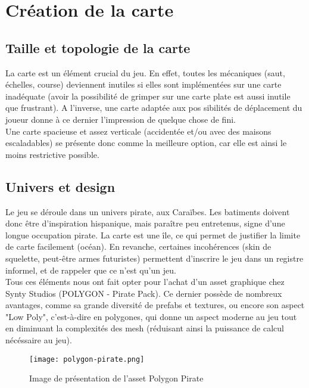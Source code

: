 \documentclass[../doc.tex]{subfiles}
\begin{document}
    \section{Création de la carte}

    \subsection{Taille et topologie de la carte}
    
    La carte est un élément crucial du jeu. En effet, toutes les mécaniques 
    (saut, échelles, course)
    deviennent inutiles si elles sont implémentées sur une carte inadéquate (avoir la 
    possibilité de grimper sur une carte plate est aussi inutile que frustrant).
    A l'inverse, une carte adaptée aux pos
    sibilités de déplacement du joueur donne à ce dernier
    l'impression de quelque chose de fini.
    \\

    Une carte spacieuse et assez verticale (accidentée et/ou avec des maisons escaladables)
    se présente donc comme la meilleure option, car elle est ainsi le moins restrictive possible.

    \subsection{Univers et design}

    Le jeu se déroule dans un univers pirate, aux Caraïbes.
    Les batiments doivent donc être d'inspiration hispanique,
    mais paraître peu entretenus, signe d'une longue occupation 
    pirate. La carte est une île, ce qui permet de justifier
    la limite de carte facilement (océan). En revanche, certaines 
    incohérences (skin de squelette, peut-être armes futuristes)
    permettent d'inscrire le jeu dans un registre informel, et de 
    rappeler que ce n'est qu'un jeu.
    \\

    Tous ces éléments nous ont fait opter pour l'achat d'un asset graphique chez 
    Synty Studios (POLYGON - Pirate Pack).
    Ce dernier possède de nombreux avantages, comme sa grande diversité de prefabs et 
    textures, ou encore son aspect "Low Poly", 
    c'est-à-dire en polygones, qui donne un aspect moderne au jeu tout en diminuant la 
    complexités des mesh (réduisant ainsi la 
    puissance de calcul nécéssaire au jeu).
    \\ 

    \begin{figure}[!ht]
        \centering
        \texttt{[image: polygon-pirate.png]}
        \caption{Image de présentation de l'asset Polygon Pirate}
    \end{figure}
        

    
    
\end{document}
